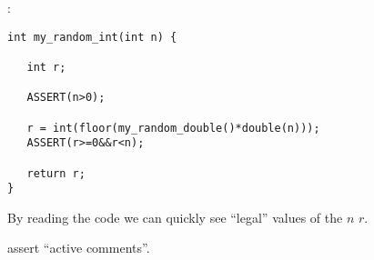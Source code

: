 :

\begin{lstlisting}[caption=GNU Chess]
int my_random_int(int n) {

   int r;

   ASSERT(n>0);

   r = int(floor(my_random_double()*double(n)));
   ASSERT(r>=0&&r<n);

   return r;
}
\end{lstlisting}

{By reading the code we can quickly see ``legal'' values of the} $n$ \AndENRU $r$.

assert ``active comments''\cite{Lakos}.

